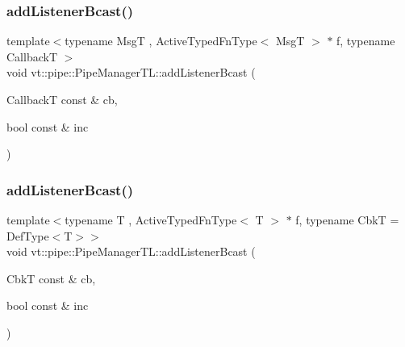 \subsubsection{\texorpdfstring{add\+Listener\+Bcast()}{addListenerBcast()}\hspace{0.1cm}{\footnotesize\ttfamily [1/2]}}
{\footnotesize\ttfamily template$<$typename MsgT , Active\+Typed\+Fn\+Type$<$ Msg\+T $>$ $\ast$ f, typename CallbackT $>$ \\
void vt\+::pipe\+::\+Pipe\+Manager\+T\+L\+::add\+Listener\+Bcast (\begin{DoxyParamCaption}\item[{CallbackT const \&}]{cb,  }\item[{bool const \&}]{inc }\end{DoxyParamCaption})}

\mbox{\label{structvt_1_1pipe_1_1_pipe_manager_t_l_abf50654cc9c8823790a0bb8fe0d0024f}} 
\subsubsection{\texorpdfstring{add\+Listener\+Bcast()}{addListenerBcast()}\hspace{0.1cm}{\footnotesize\ttfamily [2/2]}}
{\footnotesize\ttfamily template$<$typename T , Active\+Typed\+Fn\+Type$<$ T $>$ $\ast$ f, typename CbkT  = Def\+Type$<$\+T$>$$>$ \\
void vt\+::pipe\+::\+Pipe\+Manager\+T\+L\+::add\+Listener\+Bcast (\begin{DoxyParamCaption}\item[{CbkT const \&}]{cb,  }\item[{bool const \&}]{inc }\end{DoxyParamCaption})}

\mbox{\label{structvt_1_1pipe_1_1_pipe_manager_t_l_aca69c630748b177c01af61b39ffad0ec}} 
